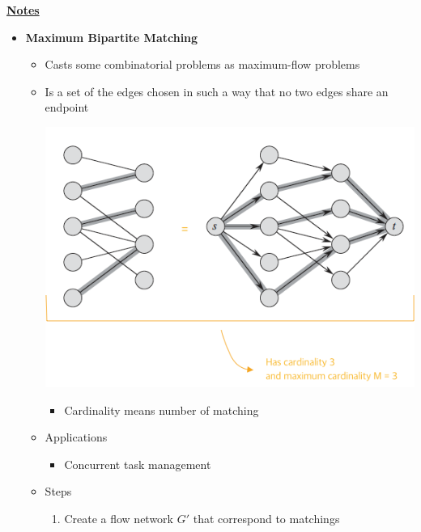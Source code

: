 \documentclass[12pt]{article}
\begin{document}
\begin{enumerate}[1.]
\begin{enumerate}[a)]
        \underline{\textbf{Notes}}

        \bigskip

        \begin{itemize}
            \item \textbf{Maximum Bipartite Matching}

            \begin{itemize}
                \item Casts some combinatorial problems as maximum-flow problems
                \item Is a set of the edges chosen in such a way that no two edges share an endpoint

                \begin{center}
                \includegraphics[width=0.7\linewidth]{images/worksheet_5_solution_33.png}
                \end{center}

                \begin{itemize}
                    \item Cardinality means number of matching
                \end{itemize}
                \item Applications

                \begin{itemize}
                    \item Concurrent task management
                \end{itemize}
                \item Steps

                \begin{enumerate}[1.]
                    \item Create a flow network $G'$ that correspond to matchings


\end{enumerate}
\end{itemize}
\end{itemize}
\end{enumerate}
\end{enumerate}
\end{document}
